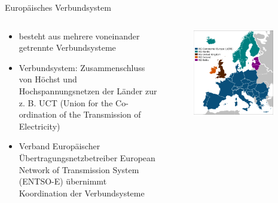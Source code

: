 \documentclass[aspectratio=1610, professionalfonts, 9pt]{beamer}
\begin{document}
{
\begin{frame}{Europäisches Verbundsystem}
\begin{columns}
\begin{column}{0.5\textwidth}
\begin{itemize}
\item besteht aus mehrere voneinander getrennte Verbundsysteme
\item Verbundsystem:
Zusammenschluss von Höchst und Hochspannungsnetzen der Länder zur z. B. UCT  (Union for the Co-ordination of the Transmission of Electricity)
\item Verband Europäischer Übertragungsnetzbetreiber
European Network of Transmission System (ENTSO-E) übernimmt Koordination
der Verbundsysteme
\end{itemize}
\end{column}
\begin{column}{0.5\textwidth}
    \begin{figure}
\includegraphics[width=0.9\textwidth]{images/Euronetz.png}
\end{figure}
\end{column}
\end{columns}
\end{frame}
}
\end{document}
